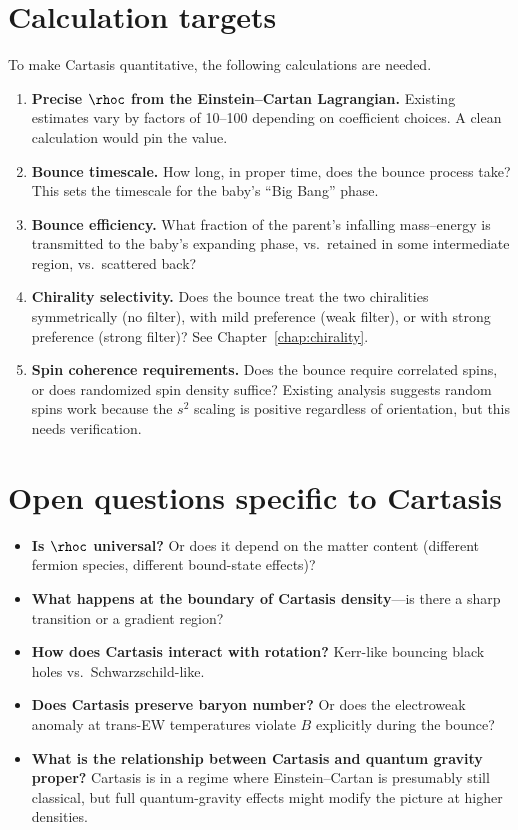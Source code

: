 \section{Calculation targets}

To make Cartasis quantitative, the following calculations are needed.

\begin{enumerate}
  \item \textbf{Precise $\rhoc$ from the Einstein--Cartan Lagrangian.} Existing
    estimates vary by factors of 10--100 depending on coefficient choices. A
    clean calculation would pin the value.
  \item \textbf{Bounce timescale.} How long, in proper time, does the bounce
    process take? This sets the timescale for the baby's ``Big Bang'' phase.
  \item \textbf{Bounce efficiency.} What fraction of the parent's infalling
    mass--energy is transmitted to the baby's expanding phase, vs.\ retained in
    some intermediate region, vs.\ scattered back?
  \item \textbf{Chirality selectivity.} Does the bounce treat the two
    chiralities symmetrically (no filter), with mild preference (weak filter),
    or with strong preference (strong filter)? See Chapter~\ref{chap:chirality}.
  \item \textbf{Spin coherence requirements.} Does the bounce require correlated
    spins, or does randomized spin density suffice? Existing analysis suggests
    random spins work because the $s^2$ scaling is positive regardless of
    orientation, but this needs verification.
\end{enumerate}

\section{Open questions specific to Cartasis}

\begin{itemize}
  \item \textbf{Is $\rhoc$ universal?} Or does it depend on the matter content
    (different fermion species, different bound-state effects)?
  \item \textbf{What happens at the boundary of Cartasis density}---is there a
    sharp transition or a gradient region?
  \item \textbf{How does Cartasis interact with rotation?} Kerr-like bouncing
    black holes vs.\ Schwarzschild-like.
  \item \textbf{Does Cartasis preserve baryon number?} Or does the electroweak
    anomaly at trans-EW temperatures violate $B$ explicitly during the bounce?
  \item \textbf{What is the relationship between Cartasis and quantum gravity
    proper?} Cartasis is in a regime where Einstein--Cartan is presumably still
    classical, but full quantum-gravity effects might modify the picture at
    higher densities.
\end{itemize}
